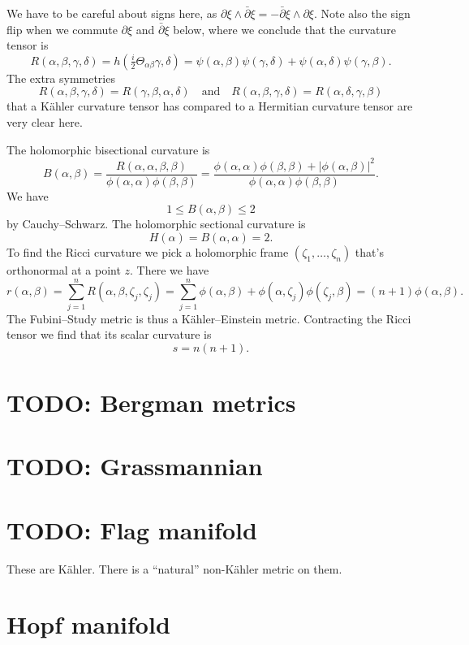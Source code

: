 \documentclass[11pt]{article}
\theoremstyle{definition}
\begin{document}
We have to be careful about signs here, as $\partial \xi \wedge \bar\partial \xi = - \bar\partial \xi \wedge \partial \xi$. Note also the sign flip when we commute $\partial\xi$ and $\bar\partial\xi$ below, where we conclude that the curvature tensor is
$$
R(\alpha,\beta,\gamma,\delta)
= h(\tfrac i2\Theta_{\alpha \beta} \gamma, \delta)
= \psi(\alpha, \beta) \psi(\gamma, \delta)
+ \psi(\alpha, \delta) \psi(\gamma, \beta).
$$
The extra symmetries
$$
R(\alpha,\beta,\gamma,\delta) = R(\gamma,\beta,\alpha,\delta)
\quad\text{and}\quad
R(\alpha,\beta,\gamma,\delta) = R(\alpha,\delta,\gamma,\beta)
$$
that a K\"ahler curvature tensor has compared to a Hermitian curvature tensor are very clear here.


The holomorphic bisectional curvature is
$$
B(\alpha,\beta) = \frac{R(\alpha,\alpha,\beta,\beta)}{\phi(\alpha,\alpha)\phi(\beta,\beta)}
= \frac{\phi(\alpha,\alpha)\phi(\beta,\beta)+|\phi(\alpha,\beta)|^2}{\phi(\alpha,\alpha)\phi(\beta,\beta)}.
$$
We have
$$
1 \leq B(\alpha,\beta) \leq 2
$$
by Cauchy--Schwarz. The holomorphic sectional curvature is
$$
H(\alpha) = B(\alpha,\alpha) = 2.
$$
To find the Ricci curvature we pick a holomorphic frame $(\zeta_1, \ldots, \zeta_n)$ that's orthonormal at a point $z$. There we have
$$
r(\alpha,\beta)
= \sum_{j=1}^n R(\alpha,\beta,\zeta_j,\zeta_j)
= \sum_{j=1}^n \phi(\alpha,\beta) + \phi(\alpha,\zeta_j)\phi(\zeta_j,\beta)
= (n+1) \phi(\alpha,\beta).
$$
The Fubini--Study metric is thus a K\"ahler--Einstein metric. Contracting the Ricci tensor we find that its scalar curvature is
$$
s = n(n+1).
$$




\section{TODO: Bergman metrics}
\label{sec:org21fa1aa}

\section{TODO: Grassmannian}
\label{sec:org34425b6}

\section{TODO: Flag manifold}
\label{sec:orga0ef6a0}

These are K\"ahler. There is a ``natural'' non-K\"ahler metric on them.

\section{Hopf manifold}
\label{sec:org8f5818e}
\end{document}
